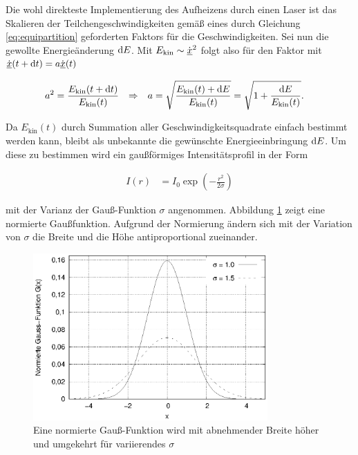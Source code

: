 		Die wohl direkteste Implementierung des Aufheizens durch einen Laser ist das Skalieren
		der Teilchengeschwindigkeiten gemäß eines durch Gleichung \eqref{eq:equipartition}
		geforderten Faktors für die Geschwindigkeiten. Sei nun die gewollte Energieänderung
		$\dx[E]$. Mit $E_\text{kin} \sim \dot{\uvec{x}}^2$ folgt also für den Faktor mit
		$\dot{\uvec{x}}(t + \dt) = a\dot{\uvec{x}}(t)$

		\begin{align}
			a^2 &= \frac{E_\text{kin}(t + \dt)}{E_\text{kin}(t)}
			&\Rightarrow&&
			a &= \sqrt{\frac{E_\text{kin}(t) + \dx[E]}{E_\text{kin}(t)}}
				= \sqrt{1 + \frac{\dx[E]}{E_\text{kin}(t)}}
			.
			\label{eq:factor}
		\end{align}

		Da $E_\text{kin}(t)$ durch Summation aller Geschwindigkeitsquadrate einfach bestimmt
		werden kann, bleibt als unbekannte die gewünschte Energieeinbringung $\dx[E]$. Um diese
		zu bestimmen wird ein gaußförmiges Intensitätsprofil in der Form

		\begin{align}
			I(r) &= I_0 \exp\left(-\frac{r^2}{2\sigma}\right) \label{eq:gauss_profile}
		\end{align}

		mit der Varianz der Gauß-Funktion $\sigma$ angenommen. Abbildung \ref{fig:gauss} zeigt
		eine normierte Gaußfunktion. Aufgrund der Normierung ändern sich mit der Variation von
		$\sigma$ die Breite und die Höhe antiproportional zueinander.

		\begin{figure}[!ht]
			\centering
			\includegraphics[width=0.8\textwidth]{chapter/main/plt/gauss.eps}
			\caption{Eine normierte Gauß-Funktion wird mit abnehmender Breite höher und
			umgekehrt für variierendes $\sigma$}
			\label{fig:gauss}
		\end{figure}

